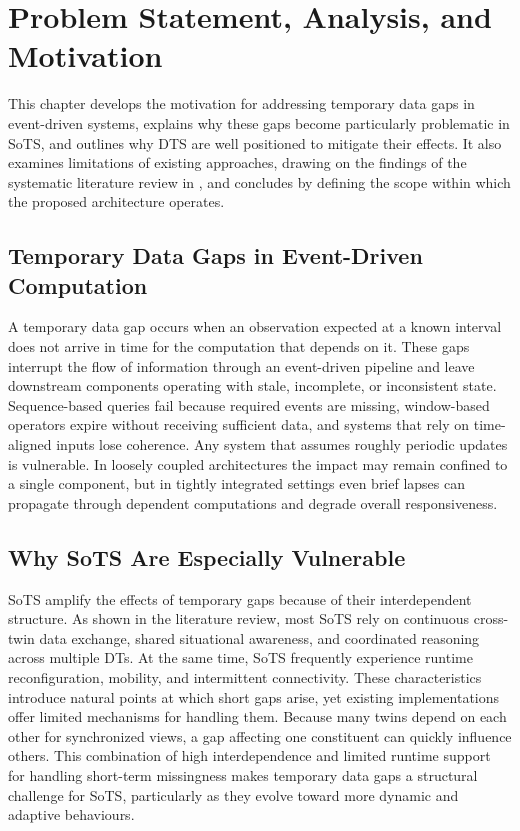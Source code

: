 \chapter{Problem Statement, Analysis, and Motivation}
\label{ch:motivation}



This chapter develops the motivation for addressing temporary data gaps in event-driven systems, explains why these gaps become particularly problematic in SoTS, and outlines why DTS are well positioned to mitigate their effects. It also examines limitations of existing approaches, drawing on the findings of the systematic literature review in , and concludes by defining the scope within which the proposed architecture operates.

\section{Temporary Data Gaps in Event-Driven Computation}

A temporary data gap occurs when an observation expected at a known interval does not arrive in time for the computation that depends on it. These gaps interrupt the flow of information through an event-driven pipeline and leave downstream components operating with stale, incomplete, or inconsistent state. Sequence-based queries fail because required events are missing, window-based operators expire without receiving sufficient data, and systems that rely on time-aligned inputs lose coherence. Any system that assumes roughly periodic updates is vulnerable. In loosely coupled architectures the impact may remain confined to a single component, but in tightly integrated settings even brief lapses can propagate through dependent computations and degrade overall responsiveness.

\section{Why SoTS Are Especially Vulnerable}

SoTS amplify the effects of temporary gaps because of their interdependent structure. As shown in the literature review, most SoTS rely on continuous cross-twin data exchange, shared situational awareness, and coordinated reasoning across multiple DTs. At the same time, SoTS frequently experience runtime reconfiguration, mobility, and intermittent connectivity. These characteristics introduce natural points at which short gaps arise, yet existing implementations offer limited mechanisms for handling them. Because many twins depend on each other for synchronized views, a gap affecting one constituent can quickly influence others. This combination of high interdependence and limited runtime support for handling short-term missingness makes temporary data gaps a structural challenge for SoTS, particularly as they evolve toward more dynamic and adaptive behaviours.

